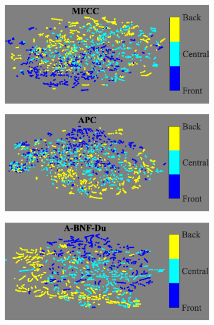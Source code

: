 \documentclass[transmag]{IEEEtran}
\begin{document}
\begin{figure}[!t]
    \begin{subfigure}{0.495\linewidth}
	   \centering
	   \includegraphics[width=1\linewidth]{tsne_af_backness_mfcc_disc_bar_adjust_journal.png}
    \end{subfigure}
   \begin{subfigure}{0.495\linewidth}
	   \centering
	   \includegraphics[width=1\linewidth]{tsne_af_backness_apc_unlab_600_disc_bar_adjust_journal.png}
    \end{subfigure}
    \newline
   \begin{subfigure}{0.495\linewidth}
	   \centering
	   \includegraphics[width=1\linewidth]{tsne_af_backness_bnf_cgn_apc_input_disc_bar_adjust_journal.png}

\end{subfigure}
\end{figure}
\end{document}
